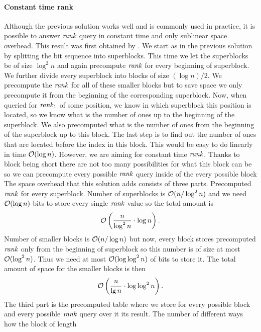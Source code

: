 \paragraph{Constant time rank}

Although the previous solution works well and is commonly used in practice, it is possible to
answer $\mathit{rank}$ query in constant time and only sublinear space overhead. This result was first
obtained by \cite{okanohara2007practical}. We start as in the previous solution by splitting
the bit sequence into superblocks. This time we let the superblocks be of size $\log^2 n$
and again precompute $\mathit{rank}$ for every beginning of superblock. We further divide every
superblock into blocks of size $(\log n)/2$. We precompute the $\mathit{rank}$ for all of these
smaller blocks but to save space we only precompute it from the beginning of the corresponding
superblock. Now, when queried for $\mathit{rank}_1$ of some position, we know in which superblock this
position is located, so we know what is the number of ones up to the beginning of the superblock.
We also precomputed what is the number of ones from the beginning of the superblock up to this
block. The last step is to find out the number of ones that are located before the index in this
block. This would be easy to do linearly in time $\mathcal{O}(\log n)$. However, we are aiming for
constant time $\mathit{rank}$. Thanks to block being short there are not too many possibilities for what
this block can be so we can precompute every possible $\mathit{rank}$ query inside of the every possible
block The space overhead that this solution adds consists of three parts.
Precomputed $\mathit{rank}$ for every superblock. Number of superblocks is $\mathcal{O}(n/\log^2 n)$ and we
need $\mathcal{O}(\log n)$ bits to store every single $\mathit{rank}$ value so the total amount is
\begin{equation}
    \mathcal{O}\left(\frac{n}{\log^2 n}\cdot \log n\right).
    \label{eq:rank_space_1}
\end{equation}
Number of smaller blocks is $\mathcal{O}(n/\log n)$ but now, every block stores precomputed $\mathit{rank}$
only from the beginning of superblock so this number is of size at most $\mathcal{O}(\log^2 n)$. Thus
we need at most $\mathcal{O}(\log\log^2 n)$ of bits to store it. The total amount of space for the
smaller blocks is then
\begin{equation}
    \mathcal{O}\left(\frac{n}{\lg n}\cdot \log\log^2 n\right).
    \label{eq:rank_space_2}
\end{equation}
The third part is the precomputed table where we store for every possible block and every
possible $\mathit{rank}$ query over it its result. The number of different ways how the block of length
